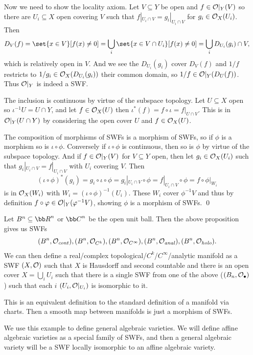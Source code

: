     Now we need to show the locality axiom.
    Let $V\subseteq Y$ be open and $f\in{{\cal O}}|_Y(V)$ so there are $U_i\subseteq X$ open covering $V$ such that $f|_{U_i\cap V}=g_i|_{U_i\cap V}$
    for $g_i\in{{\cal O}}_X(U_i)$.
    Then
    $$ D_V(f) = \set{x\in V}[f(x)\neq0] = \bigcup_i\set{x\in V\cap U_i}[f(x)\neq0] = \bigcup_i D_{U_i}(g_i)\cap V , $$
    which is relatively open in $V$.
    And we see the $D_{U_i}(g_i)$ cover $D_V(f)$ and $1/f$ restricts to $1/g_i\in{{\cal O}}_X(D_{U_i}(g_i))$ their common domain, so $1/f\in{{\cal O}}|_Y(D_U(f))$.
    Thus ${{\cal O}}|_Y$ is indeed a SWF.

    The inclusion is continuous by virtue of the subspace topology.
    Let $U\subseteq X$ open so $\iota^{-1}U=U\cap Y$, and let $f\in{{\cal O}}_X(U)$ then $\iota^*(f)=f\circ\iota=f|_{U\cap V}$.
    This is in ${{\cal O}}|_Y(U\cap Y)$ by considering the open cover $U$ and $f\in{{\cal O}}_X(U)$.

    The composition of morphisms of SWFs is a morphism of SWFs, so if $\phi$ is a morphism so is $\iota\circ\phi$.
    Conversely if $\iota\circ\phi$ is continuous, then so is $\phi$ by virtue of the subspace topology.
    And if $f\in{{\cal O}}|_Y(V)$ for $V\subseteq Y$ open, then let $g_i\in{{\cal O}}_X(U_i)$ such that $g_i|_{U_i\cap V}=f|_{U_i\cap V}$ with $U_i$ covering
    $V$.
    Then
    $$ (\iota\circ\phi)^*(g_i)=g_i\circ\iota\circ\phi=g_i|_{U_i\cap V}\circ\phi=f|_{U_i\cap V}\circ\phi=f\circ\phi|_{W_i} $$
    is in ${{\cal O}}_X(W_i)$ with $W_i=(\iota\circ\phi)^{-1}(U_i)$.
    These $W_i$ cover $\phi^{-1}V$ and thus by definition $f\circ\varphi\in{{\cal O}}|_Y(\varphi^{-1}V)$, showing $\phi$ is a morphism of SWFs.
    \qed

\eproof

\bexam

    Let $B^n\subseteq\bR^n$ or $\bC^n$ be the open unit ball.
    Then the above proposition gives us SWFs
    $$ (B^n,{{\cal O}}_{\it cont}),(B^n,{{\cal O}}_{C^k}),(B^n,{{\cal O}}_{C^\infty}),(B^n,{{\cal O}}_{\it anal}),(B^n,{{\cal O}}_{\it holo}) . $$
    We can then define a real/complex topological/$C^k$/$C^\infty$/analytic manifold as a SWF $(X,{{\cal O}})$ such that $X$ is Hausdorff and second
    countable and there is an open cover $X=\bigcup_iU_i$ such that there is a single SWF from one of the above ($(B_n,{{\cal O}}_\bullet)$) such that
    each $i$ $(U_i,{{\cal O}}|_{U_i})$ is isomorphic to it.

    This is an equivalent definition to the standard definition of a manifold via charts.
    Then a smooth map between manifolds is just a morphism of SWFs.

\eexam

We use this example to define general algebraic varieties.
We will define affine algebraic varieties as a special family of SWFs, and then a general algebraic variety will be a SWF locally isomorphic
to an affine algebraic variety.

